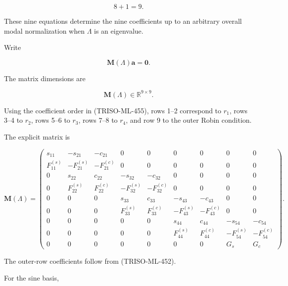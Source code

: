 \documentclass[11pt,a4paper]{article}
\begin{document}
\begin{equation}
8+1=9.
\tag{TRISO-ML-465}
\label{eq:triso-ml-465}
\end{equation}

These nine equations determine the nine coefficients up to an arbitrary overall modal normalization when $\Lambda$ is an eigenvalue.

Write

\begin{equation}
\boxed{
\mathbf M(\Lambda)\mathbf a=\mathbf0.
}
\tag{TRISO-ML-466}
\label{eq:triso-ml-466}
\end{equation}

The matrix dimensions are

\begin{equation}
\boxed{
\mathbf M(\Lambda)\in\mathbb R^{9\times9}.
}
\tag{TRISO-ML-467}
\label{eq:triso-ml-467}
\end{equation}

Using the coefficient order in (TRISO-ML-455), rows 1–2 correspond to $r_1$, rows 3–4 to $r_2$, rows 5–6 to $r_3$, rows 7–8 to $r_4$, and row 9 to the outer Robin condition.

The explicit matrix is

\begin{equation}
\mathbf M(\Lambda)=
\begin{pmatrix}
s_{11} & -s_{21} & -c_{21} & 0 & 0 & 0 & 0 & 0 & 0\\
F^{(s)}_{11} & -F^{(s)}_{21} & -F^{(c)}_{21} & 0 & 0 & 0 & 0 & 0 & 0\\
0 & s_{22} & c_{22} & -s_{32} & -c_{32} & 0 & 0 & 0 & 0\\
0 & F^{(s)}_{22} & F^{(c)}_{22} & -F^{(s)}_{32} & -F^{(c)}_{32} & 0 & 0 & 0 & 0\\
0 & 0 & 0 & s_{33} & c_{33} & -s_{43} & -c_{43} & 0 & 0\\
0 & 0 & 0 & F^{(s)}_{33} & F^{(c)}_{33} & -F^{(s)}_{43} & -F^{(c)}_{43} & 0 & 0\\
0 & 0 & 0 & 0 & 0 & s_{44} & c_{44} & -s_{54} & -c_{54}\\
0 & 0 & 0 & 0 & 0 & F^{(s)}_{44} & F^{(c)}_{44} & -F^{(s)}_{54} & -F^{(c)}_{54}\\
0 & 0 & 0 & 0 & 0 & 0 & 0 & G_s & G_c
\end{pmatrix}.
\tag{TRISO-ML-468}
\label{eq:triso-ml-468}
\end{equation}

The outer-row coefficients follow from (TRISO-ML-452).

For the sine basis,
\end{document}
